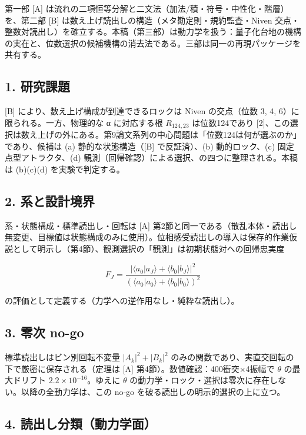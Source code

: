 \documentclass[
  a4paper,
]{ltjsarticle}
\begin{document}
第一部 {[}A{]}
は流れの二項恒等分解と二文法（加法/積・符号・中性化・階層）を、第二部
{[}B{]} は数え上げ読出しの構造（メタ勘定則・規約監査・Niven
交点・整数対読出し）を確立する。本稿（第三部）は動力学を扱う：量子化台地の機構の実在と、位数選択の候補機構の消去法である。三部は同一の再現パッケージを共有する。

\subsection{1. 研究課題}\label{ux7814ux7a76ux8ab2ux984c}

{[}B{]} により、数え上げ構成が到達できるロックは Niven の交点（位数 3,
4, 6）に限られる。一方、物理的な α に対応する根 \(R_{124,23}\)
は位数124であり
{[}2{]}、この選択は数え上げの外にある。第9論文系列の中心問題は「位数124は何が選ぶのか」であり、候補は
(a) 静的な状態構造（{[}B{]} で反証済）、(b) 動的ロック、(c)
固定点型アトラクタ、(d)
観測（回帰確認）による選択、の四つに整理される。本稿は (b)(c)(d)
を実験で判定する。

\subsection{2. 系と設計境界}\label{ux7cfbux3068ux8a2dux8a08ux5883ux754c}

系・状態構成・標準読出し・回転は {[}A{]}
第2節と同一である（散乱本体・読出し無変更、目標値は状態構成のみに使用）。位相感受読出しの導入は保存的作業仮説として明示し（第4節）、観測選択の「観測」は初期状態対への回帰忠実度

\[
F_J=\frac{|\langle a_0|a_J\rangle+\langle b_0|b_J\rangle|^2}{(\langle a_0|a_0\rangle+\langle b_0|b_0\rangle)^2}
\]

の評価として定義する（力学への逆作用なし・純粋な読出し）。

\subsection{3. 零次 no-go}\label{ux96f6ux6b21-no-go}

標準読出しはビン別回転不変量 \(|A_k|^2+|B_k|^2\)
のみの関数であり、実直交回転の下で厳密に保存される（定理は {[}A{]}
第4節）。数値確認：400衝突×4振幅で \(\theta\) の最大ドリフト
\(2.2\times10^{-16}\)。ゆえに \(\theta\)
の動力学・ロック・選択は零次に存在しない。以降の全動力学は、この no-go
を破る読出しの明示的選択の上に立つ。

\subsection{4.
読出し分類（動力学面）}\label{ux8aadux51faux3057ux5206ux985eux52d5ux529bux5b66ux9762}
\end{document}
